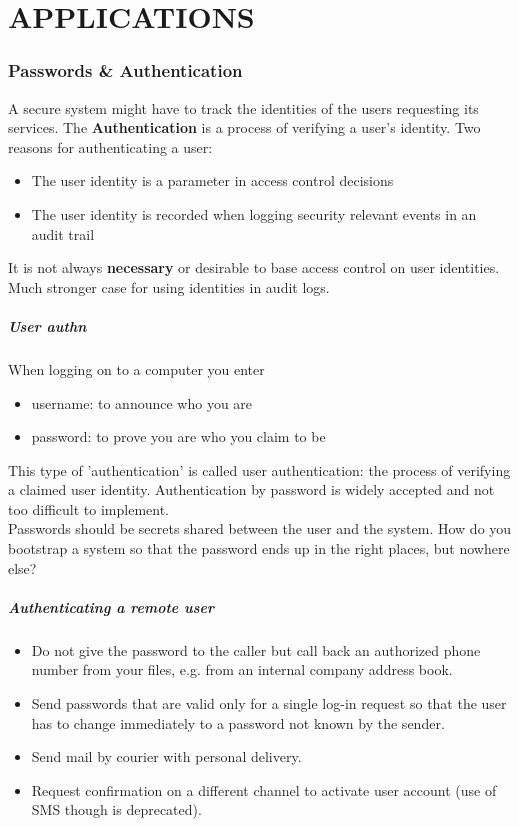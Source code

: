 \documentclass[a4paper, 10pt, titlepage]{article}
\begin{document}
\newpage
\thispagestyle{empty}
\part{APPLICATIONS}

\newpage
\section{Passwords \& Authentication}
A secure system might have to track the identities of the users requesting its services. The \textbf{Authentication} is a process of verifying a user’s identity.
Two reasons for authenticating a user:
\begin{itemize}
\item The user identity is a parameter in access control decisions
\item The user identity is recorded when logging security relevant events in an audit trail
\end{itemize}
It is not always \textbf{necessary} or desirable to base access control on user identities. Much stronger case for using identities in audit logs.

\subsubsection*{User authn}
When logging on to a computer you enter
\begin{itemize}
\item username: to announce who you are
\item password: to prove you are who you claim to be
\end{itemize}
This type of 'authentication' is called user authentication: the process of verifying a claimed user identity. Authentication by password is widely accepted and not too difficult to implement. \medskip \\
Passwords should be secrets shared between the user and the system. How do you bootstrap a system so that the password ends up in the
right places, but nowhere else?

\subsubsection*{Authenticating a remote user}
\begin{itemize}
\item Do not give the password to the caller but call back an authorized phone number from your files, e.g. from an internal company address book. 
\item Send passwords that are valid only for a single log-in request so that the user has to change immediately to a password not known by the sender.
\item Send mail by courier with personal delivery.
\item Request confirmation on a different channel to activate user account (use of SMS though is deprecated).
\end{itemize}
\end{document}
